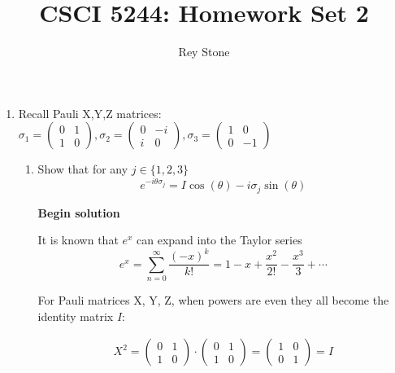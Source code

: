 \documentclass[11pt]{article}
\title{CSCI 5244: Homework Set 2}
\date{}
\author{Rey Stone}
\begin{document}
\maketitle

\begin{enumerate}
	\item Recall Pauli X,Y,Z matrices:
	      $\sigma_1 =
		      \begin{pmatrix}
			      0 & 1 \\ 1 & 0
		      \end{pmatrix},
		      \sigma_2 =
		      \begin{pmatrix}
			      0 & -i \\ i & 0
		      \end{pmatrix},
		      \sigma_3 =
		      \begin{pmatrix}
			      1 & 0 \\ 0 & -1
		      \end{pmatrix}
	      $

	      \begin{enumerate}
		      \item Show that for any $j \in {\{1,2,3\}}$
		            \begin{equation*}
			            e^{-i \theta \sigma_j} = I \cos(\theta)-i \sigma_j \sin(\theta)
		            \end{equation*}

		            \textbf{Begin solution}

		            It is known that ${e}^x$ can expand into the Taylor series
		            \begin{equation*}
			            e^x = \sum_{n=0}^{\infty} \frac{{(-x)}^k}{k!}=  1 - x + \frac{x^2}{2!} - \frac{x^3}{3} + \cdots
		            \end{equation*}

		            For Pauli matrices X, Y, Z, when powers are even they all become the identity matrix $I$:

		            \begin{align*}
			            X^2 =
			            \begin{pmatrix} 0 & 1 \\ 1 & 0 \end{pmatrix}
			            \cdot
			            \begin{pmatrix} 0 & 1 \\ 1 & 0 \end{pmatrix}
			            =
			            \begin{pmatrix} 1 & 0 \\ 0 & 1 \end{pmatrix}
			            = I
		            \end{align*}


\end{enumerate}
\end{enumerate}
\end{document}
